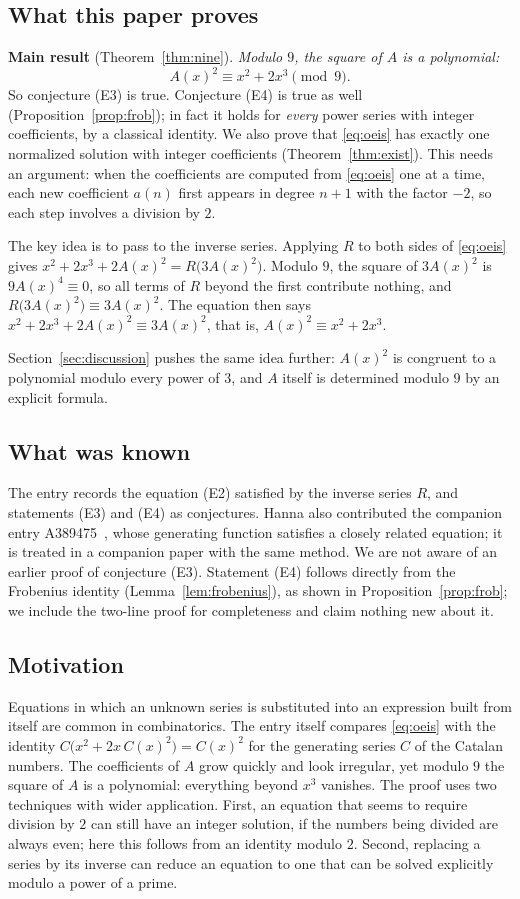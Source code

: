 \documentclass[11pt,a4paper]{article}
\theoremstyle{definition}
\theoremstyle{remark}
\begin{document}
\subsection{What this paper proves}
\textbf{Main result} (Theorem~\ref{thm:nine}). \emph{Modulo $9$, the square of $A$ is a polynomial:}
\[
A(x)^2\equiv x^2+2x^3\pmod 9 .
\]
So conjecture (E3) is true. Conjecture (E4) is true as well (Proposition~\ref{prop:frob}); in fact it holds for
\emph{every} power series with integer coefficients, by a classical identity. We also prove that \eqref{eq:oeis} has
exactly one normalized solution with integer coefficients (Theorem~\ref{thm:exist}). This needs an argument: when the coefficients
are computed from \eqref{eq:oeis} one at a time, each new coefficient $a(n)$ first appears in degree $n+1$ with the
factor $-2$, so each step involves a division by $2$.

The key idea is to pass to the inverse series. Applying $R$ to both sides of \eqref{eq:oeis} gives
$x^2+2x^3+2A(x)^2=R\bigl(3A(x)^2\bigr)$. Modulo $9$, the square of $3A(x)^2$ is $9A(x)^4\equiv0$, so all terms of $R$
beyond the first contribute nothing, and $R\bigl(3A(x)^2\bigr)\equiv3A(x)^2$. The equation then says
$x^2+2x^3+2A(x)^2\equiv3A(x)^2$, that is, $A(x)^2\equiv x^2+2x^3$.

Section~\ref{sec:discussion} pushes the same idea further: $A(x)^2$ is congruent to a polynomial modulo every power
of $3$, and $A$ itself is determined modulo $9$ by an explicit formula.

\subsection{What was known}
The entry records the equation (E2) satisfied by the inverse series $R$, and statements (E3) and (E4) as
conjectures. Hanna also contributed the companion entry A389475~\cite{oeisother}, whose generating function satisfies a
closely related equation; it is treated in a companion paper with the same method. We are not aware of an earlier
proof of conjecture (E3). Statement (E4) follows directly from the Frobenius identity (Lemma~\ref{lem:frobenius}), as
shown in Proposition~\ref{prop:frob}; we include the two-line proof for completeness and claim nothing new about it.

\subsection{Motivation}
Equations in which an unknown series is substituted into an expression built from itself are common in
combinatorics. The entry itself compares \eqref{eq:oeis} with the identity $C\bigl(x^2+2x\,C(x)^2\bigr)=C(x)^2$ for the
generating series $C$ of the Catalan numbers. The coefficients of $A$ grow quickly and look irregular, yet modulo $9$
the square of $A$ is a polynomial: everything beyond $x^3$ vanishes. The proof uses two techniques with wider application.
First, an equation that seems to require division by $2$ can still have an integer solution, if the numbers being
divided are always even; here this follows from an identity modulo $2$. Second, replacing a series by its inverse
can reduce an equation to one that can be solved explicitly modulo a power of a prime.
\end{document}
